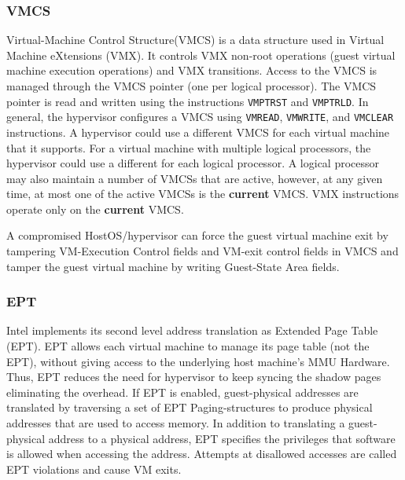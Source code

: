 \subsubsection{VMCS}%
\label{ssub:vmcs}
Virtual-Machine Control Structure(VMCS) is a data structure used in Virtual Machine eXtensions (VMX). It controls VMX non-root operations (guest virtual machine execution operations) and VMX transitions. Access to the VMCS is managed through the VMCS pointer (one per logical processor). The VMCS pointer is read and written using the instructions \verb|VMPTRST| and \verb|VMPTRLD|. In general, the hypervisor configures a VMCS using \verb|VMREAD|, \verb|VMWRITE|, and \verb|VMCLEAR| instructions. A hypervisor could use a different VMCS for each virtual machine that it supports. For a virtual machine with multiple logical processors, the hypervisor could use a different for each logical processor. A logical processor may also maintain a number of VMCSs that are active, however, at any given time, at most one of the active VMCSs is the \textbf{current} VMCS. VMX instructions operate only on the \textbf{current} VMCS. 

A compromised HostOS/hypervisor can force the guest virtual machine exit by tampering VM-Execution Control fields and VM-exit control fields in VMCS and tamper the guest virtual machine by writing Guest-State Area fields. 




\subsubsection{EPT}%
\label{ssub:ept}
Intel implements its second level address translation as Extended Page Table (EPT). 
EPT allows each virtual machine to manage its page table (not the EPT), without giving access to the underlying host machine's MMU Hardware. Thus, EPT reduces the need for hypervisor to keep syncing the shadow pages eliminating the overhead.
If EPT is enabled, guest-physical addresses are translated by traversing a set of EPT Paging-structures to produce physical addresses that are used to access memory.
In addition to translating a guest-physical address to a physical address, EPT specifies the privileges that software is allowed when accessing the address. Attempts at disallowed accesses are called EPT violations and cause VM exits.

